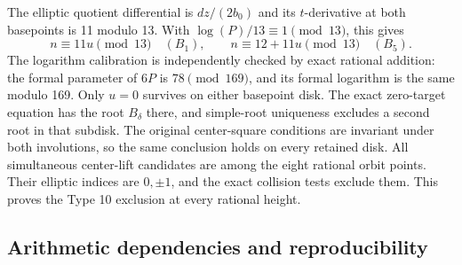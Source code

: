 The elliptic quotient differential is $dz/(2b_0)$ and its
$t$-derivative at both basepoints is 11 modulo 13. With
$\log(P)/13\equiv1\pmod{13}$, this gives
\[
 n\equiv11u\pmod{13}\quad(B_1),\qquad
 n\equiv12+11u\pmod{13}\quad(B_5).
\]
The logarithm calibration is independently checked by exact rational
addition: the formal parameter of $6P$ is $78\pmod{169}$, and its
formal logarithm is the same modulo 169. Only $u=0$ survives on
either basepoint disk. The exact zero-target equation has the root
$B_\delta$ there, and simple-root uniqueness excludes a second root
in that subdisk. The original center-square conditions are invariant
under both involutions, so the same conclusion holds on every
retained disk. All simultaneous center-lift candidates are among the
eight rational orbit points. Their elliptic indices are $0,\pm1$,
and the exact collision tests exclude them. This proves the Type 10
exclusion at every rational height.

\subsection{Arithmetic dependencies and reproducibility}

